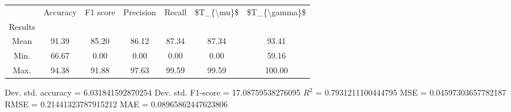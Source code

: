 \begin{tabular}{|c|c|c|c|c|c|c|}
\toprule
{} &  Accuracy &  F1 score &  Precision &  Recall &  \$T\_\{\textbackslash mu\}\$ &  \$T\_\{\textbackslash gamma\}\$ \\
Results &           &           &            &         &            &               \\
\hline
Mean    &     91.39 &     85.20 &      86.12 &   87.34 &      87.34 &         93.41 \\
Min.    &     66.67 &      0.00 &       0.00 &    0.00 &       0.00 &         59.16 \\
Max.    &     94.38 &     91.88 &      97.63 &   99.59 &      99.59 &        100.00 \\
\bottomrule
\end{tabular}

 Dev. std. accuracy = 6.031841592870254
 Dev. std. F1-score = 17.08759538276095
 $R^2$ = 0.7931211100444795
 MSE = 0.04597303657782187
 RMSE = 0.21441323787915212
 MAE = 0.08965862447623806